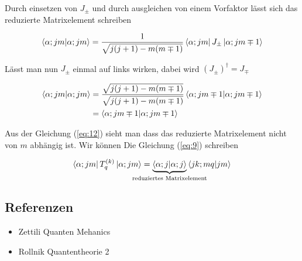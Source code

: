 Durch einsetzen von \(J_{\pm}\) und durch ausgleichen von einem Vorfaktor lässt sich das reduzierte Matrixelement schreiben


\begin{align}
  \label{eq:10}
  \braket{\alpha;jm}{\alpha; jm} = \frac{1}{\sqrt{j(j+1)-m(m\mp 1)}}  \bra{\alpha;jm}J_{\pm} \ket{\alpha; jm\mp 1}
\end{align}

Lässt man nun \(J_{\pm}\) einmal auf links wirken, dabei wird \((J_{\pm})^\dagger = J_{\mp}\)

\begin{align}
  \label{eq:12}
  \braket{\alpha;jm}{\alpha; jm} &= \frac{\sqrt{j(j+1)-m(m\mp 1)}}{\sqrt{j(j+1)-m(m\mp 1)}}  \braket{\alpha;jm\mp 1 }{\alpha; jm\mp 1} \\
&= \braket{\alpha;jm\mp 1 }{\alpha; jm\mp 1}
\end{align}

Aus der Gleichung (\ref{eq:12}) sieht man dass das reduzierte Matrixelement nicht von \(m\) abhängig ist. Wir können Die Gleichung (\ref{eq:9}) schreiben

\begin{equation}
  \label{eq:14}
   \bra{\alpha;jm} T^{(k)}_q  \ket{\alpha;jm} =  \underbr{\braket{\alpha;j}{\alpha; j}}_{\text{reduziertes Matrixelement}}   \braket{jk;mq}{jm}
\end{equation}





\subsection*{Referenzen}
\begin{itemize}
\item Zettili Quanten Mehanics
\item Rollnik Quantentheorie 2
\end{itemize}


